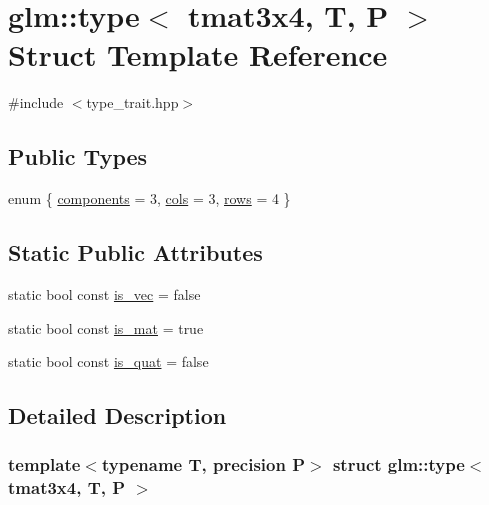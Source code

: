 \hypertarget{structglm_1_1type_3_01tmat3x4_00_01_t_00_01_p_01_4}{}\section{glm\+::type$<$ tmat3x4, T, P $>$ Struct Template Reference}
\label{structglm_1_1type_3_01tmat3x4_00_01_t_00_01_p_01_4}


{\ttfamily \#include $<$type\+\_\+trait.\+hpp$>$}

\subsection*{Public Types}
\begin{DoxyCompactItemize}
\item 
enum \{ \mbox{\hyperlink{structglm_1_1type_3_01tmat3x4_00_01_t_00_01_p_01_4_acbdc1ea9f2992d2eda376dccc0491cc2a71563d1a2e841ecc7bb749f6e0671fa2}{components}} = 3, 
\mbox{\hyperlink{structglm_1_1type_3_01tmat3x4_00_01_t_00_01_p_01_4_acbdc1ea9f2992d2eda376dccc0491cc2a9e8c30c8fe7c3af9f83afae0384aed59}{cols}} = 3, 
\mbox{\hyperlink{structglm_1_1type_3_01tmat3x4_00_01_t_00_01_p_01_4_acbdc1ea9f2992d2eda376dccc0491cc2a8d95683a8b13cadcb2bc1b56454b40fb}{rows}} = 4
 \}
\end{DoxyCompactItemize}
\subsection*{Static Public Attributes}
\begin{DoxyCompactItemize}
\item 
static bool const \mbox{\hyperlink{structglm_1_1type_3_01tmat3x4_00_01_t_00_01_p_01_4_a0f8889ba1c42a20724de490aedd7869b}{is\+\_\+vec}} = false
\item 
static bool const \mbox{\hyperlink{structglm_1_1type_3_01tmat3x4_00_01_t_00_01_p_01_4_a352d4feea2dff7acf213b9caf1a80ff2}{is\+\_\+mat}} = true
\item 
static bool const \mbox{\hyperlink{structglm_1_1type_3_01tmat3x4_00_01_t_00_01_p_01_4_a29f350bebcffa210f4cf19fadce9093f}{is\+\_\+quat}} = false
\end{DoxyCompactItemize}


\subsection{Detailed Description}
\subsubsection*{template$<$typename T, precision P$>$\newline
struct glm\+::type$<$ tmat3x4, T, P $>$}



